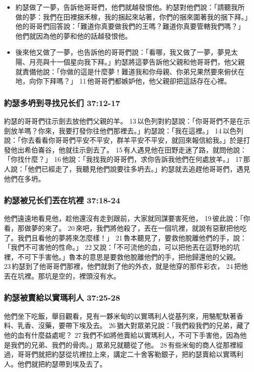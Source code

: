 \begin{itemize} 
\itemsep-.35em 
\item 約瑟做了一夢，告訴他哥哥們，他們就越發恨他。約瑟對他們說：「請聽我所做的夢：我們在田裡捆禾稼，我的捆起來站著，你們的捆來圍著我的捆下拜。」他的哥哥們回答說：「難道你真要做我們的王嗎？難道你真要管轄我們嗎？」他們就因為他的夢和他的話越發恨他。
\item 後來他又做了一夢，也告訴他的哥哥們說：「看哪，我又做了一夢，夢見太陽、月亮與十一個星向我下拜。」約瑟將這夢告訴他父親和他哥哥們，他父親就責備他說：「你做的這是什麼夢！難道我和你母親、你弟兄果然要來俯伏在地，向你下拜嗎？」 11 他哥哥們都嫉妒他，他父親卻把這話存在心裡。
\end{itemize}


\subsubsection{約瑟多坍到寻找兄长们 37:12-17}
約瑟的哥哥們往示劍去放他們父親的羊。 13 以色列對約瑟說：「你哥哥們不是在示劍放羊嗎？你來，我要打發你往他們那裡去。」約瑟說：「我在這裡。」 14 以色列說：「你去看看你哥哥們平安不平安，群羊平安不平安，就回來報信給我。」於是打發他出希伯崙谷，他就往示劍去了。 15 有人遇見他在田野走迷了路，就問他說：「你找什麼？」 16 他說：「我找我的哥哥們，求你告訴我他們在何處放羊。」 17 那人說：「他們已經走了，我聽見他們說要往多坍去。」約瑟就去追趕他哥哥們，遇見他們在多坍。




\subsubsection{約瑟被兄长们丟在坑裡 37:18-24} 
他們遠遠地看見他，趁他還沒有走到跟前，大家就同謀要害死他， 19 彼此說：「你看，那做夢的來了。 20 來吧，我們將他殺了，丟在一個坑裡，就說有惡獸把他吃了。我們且看他的夢將來怎麼樣！」 21 魯本聽見了，要救他脫離他們的手，說：「我們不可害他的性命。」 22 又說：「不可流他的血，可以把他丟在這野地的坑裡，不可下手害他。」魯本的意思是要救他脫離他們的手，把他歸還他的父親。 23 約瑟到了他哥哥們那裡，他們就剝了他的外衣，就是他穿的那件彩衣， 24 把他丟在坑裡。那坑是空的，裡頭沒有水。


\subsubsection{約瑟被賣給以實瑪利人 37:25-28} 
他們坐下吃飯，舉目觀看，見有一夥米甸的以實瑪利人從基列來，用駱駝馱著香料、乳香、沒藥，要帶下埃及去。 26 猶大對眾弟兄說：「我們殺我們的兄弟，藏了他的血有什麼益處呢？ 27 我們不如將他賣給以實瑪利人，不可下手害他，因為他是我們的兄弟、我們的骨肉。」眾弟兄就聽從了他。 28 有些米甸的商人從那裡經過，哥哥們就把約瑟從坑裡拉上來，講定二十舍客勒銀子，把約瑟賣給以實瑪利人。他們就把約瑟帶到埃及去了。



